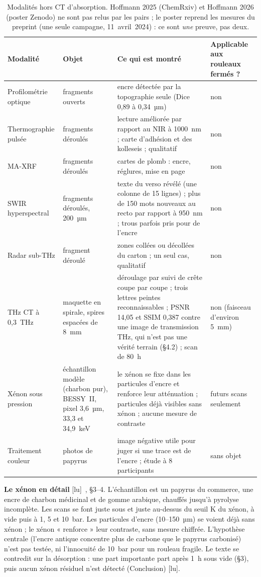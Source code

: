\documentclass[11pt,a4paper]{article}
\newcommand{\lu}{\textsf{\small[lu]}}
\begin{document}
\begin{table}[h]
\centering\small
\begin{tabularx}{\linewidth}{@{}p{3.4cm}p{3.3cm}Lp{2.4cm}@{}}
\toprule
Modalité & Objet & Ce qui est montré & Applicable aux rouleaux fermés ? \\
\midrule
Profilométrie optique \cite{angelotti2026topo} & fragments ouverts & encre détectée par la topographie seule (Dice 0,89 à 0,34~µm) & non \\
Thermographie pulsée \cite{ceccarelli2025} & fragments déroulés & lecture améliorée par rapport au NIR à 1000~nm ; carte d'adhésion et des kolleseis ; qualitatif & non \\
MA-XRF \cite{romano2023,tack2016} & fragments déroulés & cartes de plomb : encre, réglures, mise en page & non \\
SWIR hyperspectral \cite{tournie2019} & fragments déroulés, 200~µm & texte du verso révélé (une colonne de 15 lignes) ; plus de 150 mots nouveaux au recto par rapport à 950~nm ; trous parfois pris pour de l'encre & non \\
Radar sub-THz \cite{verde2025} & fragment déroulé & zones collées ou décollées du carton ; un seul cas, qualitatif & non \\
THz CT à 0,3~THz \cite{wang2022thz} & maquette en spirale, spires espacées de 8~mm & déroulage par suivi de crête coupe par coupe ; trois lettres peintes reconnaissables ; PSNR 14,05 et SSIM 0,387 contre une image de transmission THz, qui n'est pas une vérité terrain (§4.2) ; scan de 80~h & non (faisceau d'environ 5~mm) \\
Xénon sous pression \cite{hoffmann2025,hoffmann2026} & échantillon modèle (charbon pur), BESSY~II, pixel 3,6~µm, 33,3 et 34,9~keV & le xénon se fixe dans les particules d'encre et renforce leur atténuation ; particules déjà visibles sans xénon ; aucune mesure de contraste & futurs scans seulement \\
Traitement couleur \cite{atanasiu2021} & photos de papyrus & image négative utile pour juger si une trace est de l'encre ; étude à 8 participants & sans objet \\
\bottomrule
\end{tabularx}
\caption{Modalités hors CT d'absorption. Hoffmann 2025 (ChemRxiv) et Hoffmann 2026 (poster
Zenodo) ne sont pas relus par les pairs ; le poster reprend les mesures du preprint (une
seule campagne, 11~avril~2024) : ce sont \emph{une} preuve, pas deux.}
\end{table}

\noindent \textbf{Le xénon en détail} \lu~\cite{hoffmann2025}, §3–4. L'échantillon est un
papyrus du commerce, une encre de charbon médicinal et de gomme arabique, chauffés jusqu'à
pyrolyse incomplète. Les scans se font juste sous et juste au-dessus du seuil K du xénon, à
vide puis à 1, 5 et 10~bar. Les particules d'encre (10–150~µm) se voient déjà sans xénon ; le
xénon « renforce » leur contraste, sans mesure chiffrée. L'hypothèse centrale (l'encre
antique concentre plus de carbone que le papyrus carbonisé) n'est pas testée, ni l'innocuité
de 10~bar pour un rouleau fragile. Le texte se contredit sur la désorption : une part
importante part après 1~h sous vide (§3), puis aucun xénon résiduel n'est détecté
(Conclusion) \lu.
\end{document}
